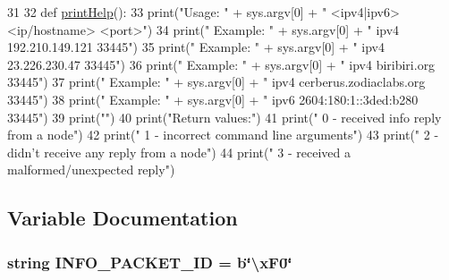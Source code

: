 \begin{DoxyCode}
31 
32 \textcolor{keyword}{def }\hyperlink{namespacebootstrap__node__info_acc2953521d81421d476f7960b21fea2a}{printHelp}():
33     print(\textcolor{stringliteral}{"Usage: "} + sys.argv[0] + \textcolor{stringliteral}{" <ipv4|ipv6> <ip/hostname> <port>"})
34     print(\textcolor{stringliteral}{"  Example: "} + sys.argv[0] + \textcolor{stringliteral}{" ipv4 192.210.149.121 33445"})
35     print(\textcolor{stringliteral}{"  Example: "} + sys.argv[0] + \textcolor{stringliteral}{" ipv4 23.226.230.47 33445"})
36     print(\textcolor{stringliteral}{"  Example: "} + sys.argv[0] + \textcolor{stringliteral}{" ipv4 biribiri.org 33445"})
37     print(\textcolor{stringliteral}{"  Example: "} + sys.argv[0] + \textcolor{stringliteral}{" ipv4 cerberus.zodiaclabs.org 33445"})
38     print(\textcolor{stringliteral}{"  Example: "} + sys.argv[0] + \textcolor{stringliteral}{" ipv6 2604:180:1::3ded:b280 33445"})
39     print(\textcolor{stringliteral}{""})
40     print(\textcolor{stringliteral}{"Return values:"})
41     print(\textcolor{stringliteral}{"  0 - received info reply from a node"})
42     print(\textcolor{stringliteral}{"  1 - incorrect command line arguments"})
43     print(\textcolor{stringliteral}{"  2 - didn't receive any reply from a node"})
44     print(\textcolor{stringliteral}{"  3 - received a malformed/unexpected reply"})

\end{DoxyCode}


\subsection{Variable Documentation}
\hypertarget{namespacebootstrap__node__info_a373a7c74e1ddad3646d66e0b422a7c5c}{
\subsubsection[{I\+N\+F\+O\+\_\+\+P\+A\+C\+K\+E\+T\+\_\+\+I\+D}]{\setlength{\rightskip}{0pt plus 5cm}string I\+N\+F\+O\+\_\+\+P\+A\+C\+K\+E\+T\+\_\+\+I\+D = b\char`\"{}\textbackslash{}x\+F0\char`\"{}}}\label{namespacebootstrap__node__info_a373a7c74e1ddad3646d66e0b422a7c5c}


